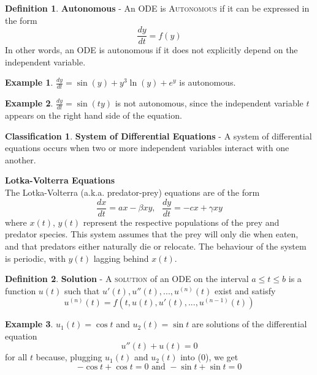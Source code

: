 \documentclass[11pt]{article}
\theoremstyle{definition}
\newtheorem{defn}{Definition}
\newtheorem{class}{Classification}
\newtheorem{ex}{Example}
\begin{document}
\begin{shaded}
\begin{defn}
\textbf{Autonomous} - An ODE is \textsc{Autonomous} if it can be expressed in the form \begin{equation}\frac{dy}{dt} = f(y)\end{equation}In other words, an ODE is autonomous if it does not explicitly depend on the independent variable.
\end{defn}
\end{shaded}
\begin{ex}
   $\frac{dy}{dt} = \sin{(y)} + y^3\ln{(y)} + e^y$ is autonomous.
\end{ex}
\begin{ex}
   $\frac{dy}{dt} = \sin{(ty)}$ is not autonomous, since the independent variable $t$ appears on the right hand side of the equation.
\end{ex}
\begin{class}
\textbf{System of Differential Equations} - A system of differential equations occurs when two or more independent variables interact with one another.
\end{class}
\begin{shaded}
    \textbf{Lotka-Volterra Equations}\\
    The Lotka-Volterra (a.k.a. predator-prey) equations are of the form \begin{equation}
        \frac{dx}{dt} = ax - \beta xy,\,\,\,\,
        \frac{dy}{dt} = -cx + \gamma xy
    \end{equation} where $x(t)$, $y(t)$ represent the respective populations of the prey and predator species. This system assumes that the prey will only die when eaten, and that predators either naturally die or relocate. The behaviour of the system is periodic, with $y(t)$ lagging behind $x(t)$.
\end{shaded}
\begin{shaded}
\begin{defn}
\textbf{Solution} - A \textsc{solution} of an ODE on the interval $a \leq t\leq b$ is a function $u(t)$ such that $u'(t), u''(t), ..., u^{(n)}(t)$ exist and satisfy \begin{equation}
u^{(n)}(t) = f(t, u(t), u'(t), ..., u^{(n - 1)}(t))
\end{equation}
\end{defn}
\end{shaded}
\begin{ex}
    $u_1(t) = \cos{t}$ and $u_2(t) = \sin{t}$ are solutions of the differential equation \begin{equation}
        u''(t) + u(t) = 0
    \end{equation} for all $t$ because, plugging $u_1(t)$ and $u_2(t)$ into (0), we get \begin{equation}
        -\cos{t} + \cos{t} = 0\text{ and }-\sin{t} + \sin{t} = 0
    \end{equation}
\end{ex}
\end{document}
